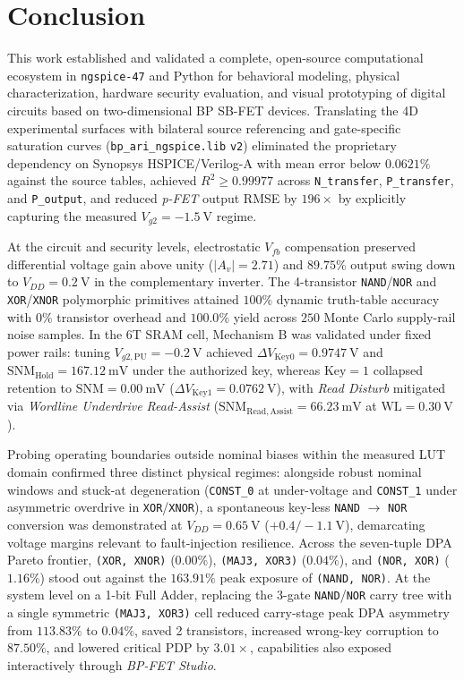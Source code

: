\section{Conclusion}\label{sec:conclusion}

This work established and validated a complete, open-source computational ecosystem in \texttt{ngspice-47} and Python for behavioral modeling, physical characterization, hardware security evaluation, and visual prototyping of digital circuits based on two-dimensional BP SB-FET devices. Translating the 4D experimental surfaces with bilateral source referencing and gate-specific saturation curves (\texttt{bp\_ari\_ngspice.lib} \texttt{v2}) eliminated the proprietary dependency on Synopsys HSPICE/Verilog-A with mean error below $0.0621\%$ against the source tables, achieved $R^2 \ge 0.99977$ across \texttt{N\_transfer}, \texttt{P\_transfer}, and \texttt{P\_output}, and reduced \textit{p-FET} output RMSE by $196\times$ by explicitly capturing the measured $V_{g2} = -1.5\ \text{V}$ regime.

At the circuit and security levels, electrostatic $V_{fb}$ compensation preserved differential voltage gain above unity ($|A_v| = 2.71$) and $89.75\%$ output swing down to $V_{DD} = 0.2\ \text{V}$ in the complementary inverter. The 4-transistor \texttt{NAND}/\texttt{NOR} and \texttt{XOR}/\texttt{XNOR} polymorphic primitives attained $100\%$ dynamic truth-table accuracy with $0\%$ transistor overhead and $100.0\%$ yield across $250$ Monte Carlo supply-rail noise samples. In the 6T SRAM cell, Mechanism B was validated under fixed power rails: tuning $V_{g2,\mathrm{PU}} = -0.2\ \text{V}$ achieved $\Delta V_{\mathrm{Key0}} = 0.9747\ \text{V}$ and $\mathrm{SNM}_{\mathrm{Hold}} = 167.12\ \text{mV}$ under the authorized key, whereas $\text{Key}=1$ collapsed retention to $\mathrm{SNM} = 0.00\ \text{mV}$ ($\Delta V_{\mathrm{Key1}} = 0.0762\ \text{V}$), with \textit{Read Disturb} mitigated via \textit{Wordline Underdrive Read-Assist} ($\mathrm{SNM}_{\mathrm{Read,Assist}} = 66.23\ \text{mV}$ at $\mathrm{WL}=0.30\ \text{V}$).

Probing operating boundaries outside nominal biases within the measured LUT domain confirmed three distinct physical regimes: alongside robust nominal windows and stuck-at degeneration (\texttt{CONST\_0} at under-voltage and \texttt{CONST\_1} under asymmetric overdrive in \texttt{XOR}/\texttt{XNOR}), a spontaneous key-less \texttt{NAND} $\to$ \texttt{NOR} conversion was demonstrated at $V_{DD}=0.65\ \text{V}$ ($+0.4/-1.1\ \text{V}$), demarcating voltage margins relevant to fault-injection resilience. Across the seven-tuple DPA Pareto frontier, \texttt{(XOR, XNOR)} ($0.00\%$), \texttt{(MAJ3, XOR3)} ($0.04\%$), and \texttt{(NOR, XOR)} ($1.16\%$) stood out against the $163.91\%$ peak exposure of \texttt{(NAND, NOR)}. At the system level on a 1-bit Full Adder, replacing the 3-gate \texttt{NAND}/\texttt{NOR} carry tree with a single symmetric \texttt{(MAJ3, XOR3)} cell reduced carry-stage peak DPA asymmetry from $113.83\%$ to $0.04\%$, saved 2 transistors, increased wrong-key corruption to $87.50\%$, and lowered critical PDP by $3.01\times$, capabilities also exposed interactively through \textit{BP-FET Studio}.


